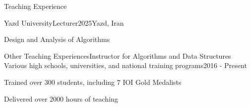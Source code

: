 \begin{section}{Teaching Experience}
  \begin{subsectionnobullet}{Yazd University}{Lecturer}{2025}{Yazd, Iran}
    \item Design and Analysis of Algorithms
  \end{subsectionnobullet}

  \begin{subsectionnobullet}{Other Teaching Experiences}{Instructor for Algorithms and Data Structures\\Various high schools, universities, and national training programs}{2016 - Present}{}
    \item Trained over 300 students, including 7 IOI Gold Medalists
    \item Delivered over 2000 hours of teaching
  \end{subsectionnobullet}

\end{section}
